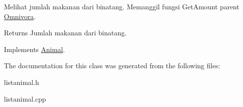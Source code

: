 Melihat jumlah makanan dari binatang. Memanggil fungsi Get\+Amount parent \hyperlink{classOmnivora}{Omnivora}. 

\begin{DoxyReturn}{Returns}
Jumlah makanan dari binatang. 
\end{DoxyReturn}


Implements \hyperlink{classAnimal_a3f1cced7bac93f7c88a24ec5a0e989fe}{Animal}.



The documentation for this class was generated from the following files\+:\begin{DoxyCompactItemize}
\item 
listanimal.\+h\item 
listanimal.\+cpp\end{DoxyCompactItemize}
